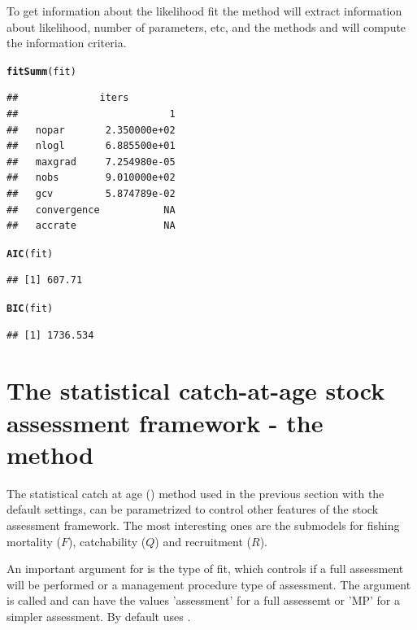 \documentclass[a4paper,english,10pt]{article}\usepackage[]{graphicx}\usepackage[]{color}
\makeatletter
\newcommand{\hlstd}[1]{\textcolor[rgb]{0.345,0.345,0.345}{#1}}%
\newcommand{\hlkwd}[1]{\textcolor[rgb]{0.737,0.353,0.396}{\textbf{#1}}}%
\newenvironment{kframe}{%
 \def\at@end@of@kframe{}%
 \ifinner\ifhmode%
  \def\at@end@of@kframe{\end{minipage}}%
  \begin{minipage}{\columnwidth}%
 \fi\fi%
 \def\FrameCommand##1{\hskip\@totalleftmargin \hskip-\fboxsep
 \colorbox{shadecolor}{##1}\hskip-\fboxsep
     \hskip-\linewidth \hskip-\@totalleftmargin \hskip\columnwidth}%
 \MakeFramed {\advance\hsize-\width
   \@totalleftmargin\z@ \linewidth\hsize
   \@setminipage}}%
 {\par\unskip\endMakeFramed%
 \at@end@of@kframe}
\newenvironment{knitrout}{}{} %
\makeatother
\begin{document}


To get information about the likelihood fit the method  will extract information about likelihood, number of parameters, etc, and the methods  and  will compute the information criteria.

\begin{knitrout}
\color{fgcolor}\begin{kframe}
\begin{alltt}
\hlkwd{fitSumm}\hlstd{(fit)}
\end{alltt}
\begin{verbatim}
##              iters
##                          1
##   nopar       2.350000e+02
##   nlogl       6.885500e+01
##   maxgrad     7.254980e-05
##   nobs        9.010000e+02
##   gcv         5.874789e-02
##   convergence           NA
##   accrate               NA
\end{verbatim}
\begin{alltt}
\hlkwd{AIC}\hlstd{(fit)}
\end{alltt}
\begin{verbatim}
## [1] 607.71
\end{verbatim}
\begin{alltt}
\hlkwd{BIC}\hlstd{(fit)}
\end{alltt}
\begin{verbatim}
## [1] 1736.534
\end{verbatim}
\end{kframe}
\end{knitrout}

\section{The statistical catch-at-age stock assessment framework - the  method}

The statistical catch at age () method used in the previous section with the default settings, can be parametrized to control other features of the stock assessment framework. The most interesting ones are the submodels for fishing mortality ($F$), catchability ($Q$) and recruitment ($R$). 

An important argument for  is the type of fit, which controls if a full assessment will be performed or a management procedure type of assessment. The argument is called  and can have the values 'assessment' for a full assessemt or 'MP' for a simpler assessment. By default  uses . 
\end{document}

